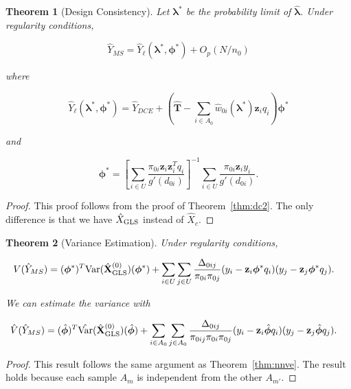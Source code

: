 \documentclass[12pt]{article}
\newtheorem{theorem}{Theorem}
\newcommand{\Var}{{\text{Var}}}
\renewcommand{\bf}[1]{\mathbf{#1}}
\begin{document}
\begin{theorem}[Design Consistency]
  Let $\bm \lambda^*$ be the probability limit of $\hat{\bm \lambda}$.
  Under regularity conditions,

  $$\hat Y_{MS} = \hat Y_{\ell}(\bm \lambda^*, \bm \phi^*) + O_p(N / n_0)$$

  where

  $$
  \hat Y_\ell(\bm \lambda^*, \bm \phi^*) = \hat Y_{DCE} + \left(
    \widehat{\bf T} - \sum_{i \in A_0} \hat w_{0i}(\bm \lambda^*) \bf z_i q_i
  \right)\bm \phi^*
  $$

  and 

  $$
  \bm \phi^* = 
  \left[\sum_{i \in U} \frac{\pi_{0i} \bf z_i \bf z_i^T q_i}{g'(d_{0i})}\right]^{-1}
  \sum_{i \in U} \frac{\pi_{0i} \bf z_i y_i}{g'(d_{0i})}.
  $$
\end{theorem}

\begin{proof}
  This proof follows from the proof of Theorem~\ref{thm:dc2}. The only
  difference is that we have $\hat X_{\rm GLS}$ instead of $\hat X_c$.
\end{proof}

\begin{theorem}[Variance Estimation]
  Under regularity conditions,

  $$
  \begin{aligned}
    V(\hat Y_{MS}) 
    &= (\bm \phi^{*})^T\Var(\hat{\bf X}_{\rm GLS}^{(0)}) (\bm \phi^{*}) + 
      \sum_{i \in U} \sum_{j \in U} \frac{\Delta_{0ij}}{\pi_{0i}\pi_{0j}}
      (y_i - \bf z_i\bm \phi^{*}q_i)
      (y_j - \bf z_j\bm \phi^{*}q_j). 
  \end{aligned}
  $$

  We can estimate the variance with

  $$
  \begin{aligned}
    \hat V(\hat Y_{MS}) 
    &= (\hat{\bm \phi})^T \hat \Var(\hat{\bf X}_{\rm GLS}^{(0)}) (\hat{\bm \phi})
    + \sum_{i \in A_0} \sum_{j \in A_0} \frac{\Delta_{0ij}}{\pi_{0ij}\pi_{0i}\pi_{0j}}
      (y_i - \bf z_i \hat{\bm \phi}q_i)
      (y_j - \bf z_j \hat{\bm \phi}q_j). 
  \end{aligned}
  $$

\end{theorem}

\begin{proof}
  This result follows the same argument as Theorem~\eqref{thm:nnve}. The result
  holds because each sample $A_m$ is independent from the other $A_{m'}$.
\end{proof}
\end{document}
